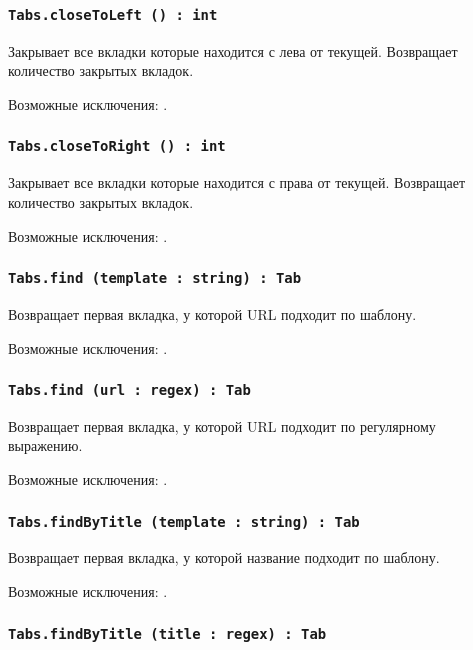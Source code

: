\subsubsection{\lstinline|Tabs.closeToLeft () : int|}

Закрывает все вкладки которые находится с лева от текущей. Возвращает количество закрытых вкладок.

Возможные исключения: .

\subsubsection{\lstinline|Tabs.closeToRight () : int|}

Закрывает все вкладки которые находится с права от текущей. Возвращает количество закрытых вкладок.

Возможные исключения: .

\subsubsection{\lstinline|Tabs.find (template : string) : Tab|}

Возвращает первая вкладка, у которой URL подходит по шаблону.

Возможные исключения: .

\subsubsection{\lstinline|Tabs.find (url : regex) : Tab|}

Возвращает первая вкладка, у которой URL подходит по регулярному выражению.

Возможные исключения: .

\subsubsection{\lstinline|Tabs.findByTitle (template : string) : Tab|}

Возвращает первая вкладка, у которой название подходит по шаблону.

Возможные исключения: .

\subsubsection{\lstinline|Tabs.findByTitle (title : regex) : Tab|}

